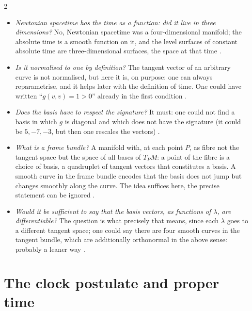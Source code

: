 \begin{paracol}{2}
\begin{coursenote}
\begin{itemize}
  \item \emph{Newtonian spacetime has the time as a function: did it live in three dimensions?} No, Newtonian spacetime was a four-dimensional manifold; the absolute time is a smooth function on it, and the level surfaces of constant absolute time are three-dimensional surfaces, the space at that time .
  \item \emph{Is it normalised to one by definition?} The tangent vector of an arbitrary curve is not normalised, but here it is, on purpose: one can always reparametrise, and it helps later with the definition of time. One could have written ``$g(v,v)=1>0$'' already in the first condition .
  \item \emph{Does the basis have to respect the signature?} It must: one could not find a basis in which $g$ is diagonal and which does not have the signature (it could be $5,-7,-3$, but then one rescales the vectors) .
  \item \emph{What is a frame bundle?} A manifold with, at each point $P$, as fibre not the tangent space but the space of all bases of $T_PM$: a point of the fibre is a choice of basis, a quadruplet of tangent vectors that constitutes a basis. A smooth curve in the frame bundle encodes that the basis does not jump but changes smoothly along the curve. The idea suffices here, the precise statement can be ignored .
  \item \emph{Would it be sufficient to say that the basis vectors, as functions of $\lambda$, are differentiable?} The question is what precisely that means, since each $\lambda$ goes to a different tangent space; one could say there are four smooth curves in the tangent bundle, which are additionally orthonormal in the above sense: probably a leaner way .
\end{itemize}
\end{coursenote}

\section{The clock postulate and proper time}\label{sec:c13-clock}


\end{paracol}
